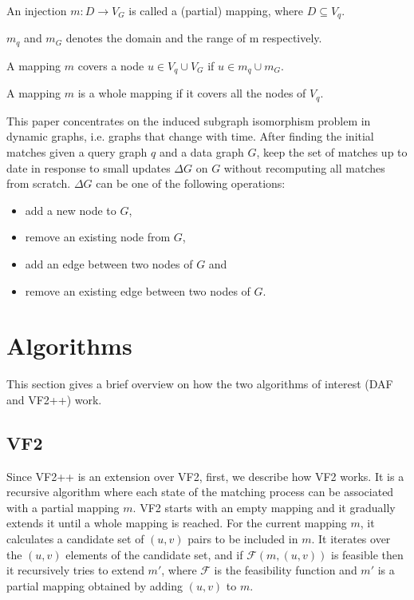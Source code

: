 \begin{definition}
    An injection $m : D \rightarrow V_G$ is called a (partial) mapping, where $D \subseteq V_q$.
\end{definition}

\begin{definition}
    $m_q$ and $m_G$ denotes the domain and the range of m respectively.
\end{definition}

\begin{definition}
    A mapping $m$ covers a node $u \in V_q \cup V_G$ if $u \in m_q \cup m_G$.
\end{definition}

\begin{definition}
    A mapping $m$ is a whole mapping if it covers all the nodes of $V_q$.
\end{definition}


This paper concentrates on the induced subgraph isomorphism problem in dynamic graphs, 
i.e. graphs that change with time. After finding the initial matches given a query graph
\(q\) and a data graph \(G\), keep the set of matches up to date in response to small 
updates \(\Delta G \) on \(G\) without recomputing all matches from scratch. \(\Delta G\) 
can be one of the following operations:
\begin{itemize}
    \item add a new node to \(G\),
    \item remove an existing node from \(G\),
    \item add an edge between two nodes of \(G\) and
    \item remove an existing edge between two nodes of \(G\).
\end{itemize}

\section{Algorithms}

This section gives a brief overview on how the two algorithms of interest (DAF and VF2++)
work.

\subsection{VF2}

Since VF2++ is an extension over VF2, first, we describe how VF2 works. It is a recursive 
algorithm where each state of the matching process can be associated with a partial mapping
$m$. VF2 starts with an empty mapping and it 
gradually extends it until a whole mapping is reached. For the current mapping $m$, it calculates a 
candidate set of $(u, v)$ pairs to be included in $m$. It iterates over the
$(u, v)$ elements of the candidate set, and if $\mathcal{F}(m, (u, v))$ is feasible then it recursively 
tries to extend $m'$, where $\mathcal{F}$ is the feasibility function and $m'$ is a partial mapping
obtained by adding $(u, v)$ to $m$.

